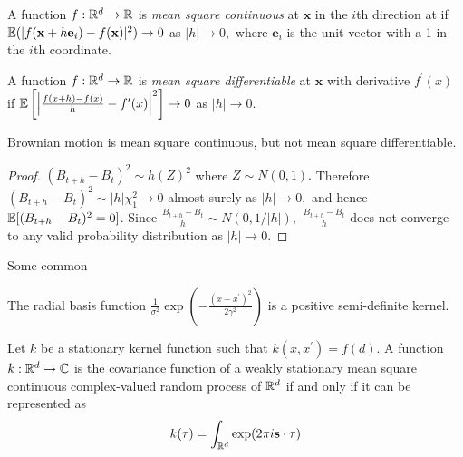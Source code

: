 \begin{definition}
    A function $f:\mathbb{R}^d\to\mathbb{R}$ is \emph{mean square continuous} at $\mathbf{x}$ in the $i$th direction at if $\operatorname{\mathbb{E}}(|f(\mathbf{x} + h\mathbf{e}_i) - f(\mathbf{x})|^2)\to 0$ as $|h|\to 0,$ where $\mathbf{e}_i$ is the unit vector with a 1 in the $i$th coordinate.
\end{definition}

\begin{definition}
    A function $f:\mathbb{R}^d\to\mathbb{R}$ is \emph{mean square differentiable} at $\mathbf{x}$ with derivative $f^\prime(x)$ if $\operatorname{\mathbb{E}}\left[\left|\frac{f(x + h) - f(x)}{h} - f^\prime(x)\right|^2\right]\to 0$ as $|h|\to 0.$
\end{definition}

\begin{theorem}
    Brownian motion is mean square continuous, but not mean square differentiable. 
\end{theorem}
\begin{proof}
    $(B_{t + h} - B_t)^2 \sim h(Z)^2$ where $Z\sim N(0,1).$ Therefore $(B_{t + h} - B_t)^2 \sim |h|\chi_1^2 \to 0$ almost surely as $|h|\to 0,$ and hence $\operatorname{\mathbb{E}}[(B_{t + h} - B_t)^2= 0]$. Since $\frac{B_{t + h} - B_t}{h} \sim N(0, 1/|h|),$ $\frac{B_{t + h} - B_t}{h}$ does not converge to any valid probability distribution as $|h| \to 0.$
\end{proof}

Some common

\color{red}

\begin{theorem}\label{thm:rbf_pos_def}
    The radial basis function
    $\frac{1}{\sigma^2}\exp(-\frac{(x - x^\prime)^2}{2\gamma^2})$ is a positive
    semi-definite kernel.
\end{theorem}

\begin{theorem}
    Let $k$ be a stationary kernel function such that
    $k(x, x^\prime) = f(d)$. A function $k:\mathbb{R}^d\to\mathbb{C}$ is the covariance
    function of a weakly
    stationary mean square continuous complex-valued random process of $\mathbb{R}^d$
    if and only if it can be represented as
    $$k(\mathbf{\tau}) = \int_{\mathbb{R}^d} \exp(2\pi i \mathbf{s}\cdot\mathbf{\tau})$$
\end{theorem}

\parencite[82]{rasmussen_gaussian_2008}

\color{black}

